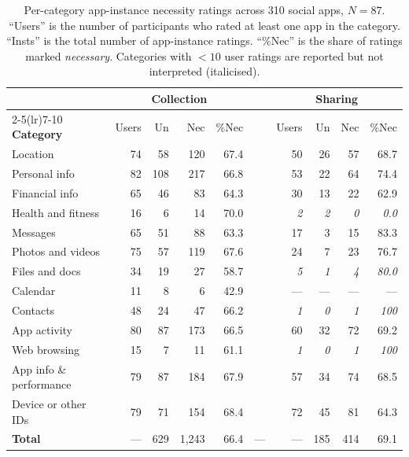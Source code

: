\begin{table}[!htbp]
\centering\small
\caption{Per-category app-instance necessity ratings across 310 social
apps, $N{=}87$. ``Users'' is the number of participants who rated at
least one app in the category. ``Insts'' is the total number of
app-instance ratings. ``\%Nec'' is the share of ratings marked
\emph{necessary}. Categories with $<10$ user ratings are reported but
not interpreted (italicised).}
\label{tab:per-cat-necessity}
\renewcommand{\arraystretch}{1.1}
\begin{tabular}{l rrrrr rrrr}
\toprule
& \multicolumn{4}{c}{\textbf{Collection}} & & \multicolumn{4}{c}{\textbf{Sharing}}\\
\cmidrule(lr){2-5}\cmidrule(lr){7-10}
\textbf{Category} & Users & Un & Nec & \%Nec & & Users & Un & Nec & \%Nec \\
\midrule
Location                & 74 & 58 & 120 & 67.4 & & 50 & 26 & 57 & 68.7 \\
Personal info           & 82 & 108& 217 & 66.8 & & 53 & 22 & 64 & 74.4 \\
Financial info          & 65 & 46 & 83  & 64.3 & & 30 & 13 & 22 & 62.9 \\
Health and fitness      & 16 & 6  & 14  & 70.0 & & \emph{2} & \emph{2} & \emph{0} & \emph{0.0} \\
Messages                & 65 & 51 & 88  & 63.3 & & 17 & 3 & 15 & 83.3 \\
Photos and videos       & 75 & 57 & 119 & 67.6 & & 24 & 7 & 23 & 76.7 \\
Files and docs          & 34 & 19 & 27  & 58.7 & & \emph{5} & \emph{1} & \emph{4} & \emph{80.0} \\
Calendar                & 11 & 8  & 6   & 42.9 & & --- & --- & --- & --- \\
Contacts                & 48 & 24 & 47  & 66.2 & & \emph{1} & \emph{0} & \emph{1} & \emph{100} \\
App activity            & 80 & 87 & 173 & 66.5 & & 60 & 32 & 72 & 69.2 \\
Web browsing            & 15 & 7  & 11  & 61.1 & & \emph{1} & \emph{0} & \emph{1} & \emph{100} \\
App info \& performance & 79 & 87 & 184 & 67.9 & & 57 & 34 & 74 & 68.5 \\
Device or other IDs     & 79 & 71 & 154 & 68.4 & & 72 & 45 & 81 & 64.3 \\
\midrule
\textbf{Total} & --- & 629 & 1{,}243 & 66.4 & --- & --- & 185 & 414 & 69.1 \\
\bottomrule
\end{tabular}
\end{table}
